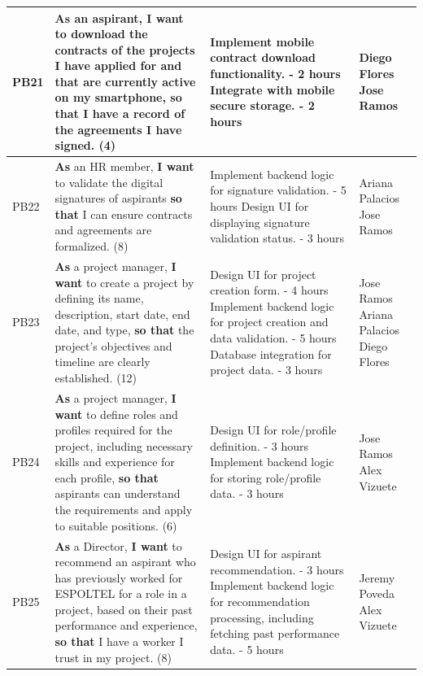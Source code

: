 \documentclass{scrreprt}
\begin{document}
\begin{longtable}{|p{1.5cm}|p{5.5cm}|p{4.5cm}|p{3cm}|}
	PB21 & \textbf{As} an aspirant, \textbf{I want} to download the contracts of the projects I have applied for and that are currently active on my smartphone, \textbf{so that} I have a record of the agreements I have signed. (4) &
	Implement mobile contract download functionality. - 2 hours \newline
	Integrate with mobile secure storage. - 2 hours &
	Diego Flores \newline
	Jose Ramos \\ \hline
	
	
	PB22 & \textbf{As} an HR member, \textbf{I want} to validate the digital signatures of aspirants \textbf{so that} I can ensure contracts and agreements are formalized. (8) &
	
	Implement backend logic for signature validation. - 5 hours \newline
	Design UI for displaying signature validation status. - 3 hours &
	Ariana Palacios \newline
	Jose Ramos\\ \hline
	
	PB23 & \textbf{As} a project manager, \textbf{I want} to create a project by defining its name, description, start date, end date, and type, \textbf{so that} the project's objectives and timeline are clearly established. (12) &
	
	Design UI for project creation form. - 4 hours \newline
	Implement backend logic for project creation and data validation. - 5 hours \newline
	Database integration for project data. - 3 hours &
	Jose Ramos \newline
	Ariana Palacios \newline
	Diego Flores \\ \hline
	
	PB24 & \textbf{As} a project manager, \textbf{I want} to define roles and profiles required for the project, including necessary skills and experience for each profile, \textbf{so that} aspirants can understand the requirements and apply to suitable positions. (6) &
	
	Design UI for role/profile definition. - 3 hours \newline
	Implement backend logic for storing role/profile data. - 3 hours &
	Jose Ramos \newline
	Alex Vizuete \\ \hline
	
	PB25 & \textbf{As} a Director, \textbf{I want} to recommend an aspirant who has previously worked for ESPOLTEL for a role in a project, based on their past performance and experience, \textbf{so that} I have a worker I trust in my project. (8) &
	Design UI for aspirant recommendation. - 3 hours \newline
	Implement backend logic for recommendation processing, including fetching past performance data. - 5 hours &
	Jeremy Poveda \newline
	Alex Vizuete \\ \hline
	

\end{longtable}
\end{document}
